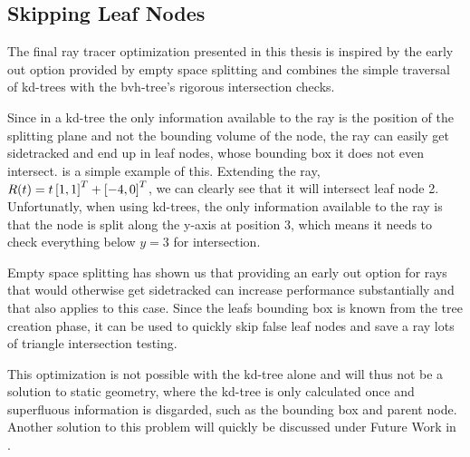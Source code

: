 \subsection{Skipping Leaf Nodes}


The final ray tracer optimization presented in this thesis is inspired
by the early out option provided by empty space splitting and combines
the simple traversal of kd-trees with the bvh-tree's rigorous
intersection checks.

Since in a kd-tree the only information available to the ray is the
position of the splitting plane and not the bounding volume of the
node, the ray can easily get sidetracked and end up in leaf nodes,
whose bounding box it does not even intersect. 
is a simple example of this. Extending the ray, $R(t) = t
\left[1, 1 \right]^T + \left[-4, 0 \right]^T$, we can clearly see that it will
intersect leaf node 2. Unfortunatly, when using kd-trees, the only
information available to the ray is that the node is split along the
y-axis at position 3, which means it needs to check everything below
$y=3$ for intersection. 


Empty space splitting has shown us that providing an early out option
for rays that would otherwise get sidetracked can increase performance
substantially and that also applies to this case. Since the leafs
bounding box is known from the tree creation phase, it can be used to
quickly skip false leaf nodes and save a ray lots of triangle
intersection testing.

This optimization is not possible with the kd-tree alone and will thus
not be a solution to static geometry, where the kd-tree is only
calculated once and superfluous information is disgarded, such as the
bounding box and parent node. Another solution to this problem will
quickly be discussed under Future Work in .

